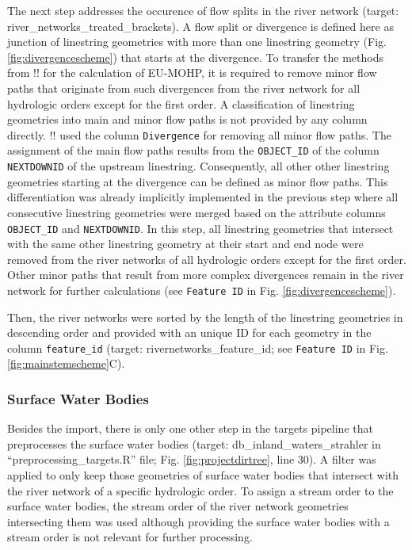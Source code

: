 \documentclass[fleqn,10pt]{wlscirep}
\begin{document}
The next step addresses the occurence of flow splits in the river network (target: river\_networks\_treated\_brackets). A flow split or divergence is defined here as junction of linestring geometries with more than one linestring geometry (Fig. \ref{fig:divergencescheme}) that starts at the divergence. To transfer the methods from !!\cite{belitz_multiorder_2019} for the calculation of EU-MOHP, it is required to remove minor flow paths that originate from such divergences from the river network for all hydrologic orders except for the first order. A classification of linestring geometries into main and minor flow paths is not provided by any column directly. !!\cite{belitz_multiorder_2019} used the column \texttt{Divergence} for removing all minor flow paths. The assignment of the main flow paths results from the \texttt{OBJECT\_ID} of the column \texttt{NEXTDOWNID} of the upstream linestring. Consequently, all other other linestring geometries starting at the divergence can be defined as minor flow paths. This differentiation was already implicitly implemented in the previous step where all consecutive linestring geometries were merged based on the attribute columns \texttt{OBJECT\_ID} and \texttt{NEXTDOWNID}. In this step, all linestring geometries that intersect with the same other linestring geometry at their start and end node were removed from the river networks of all hydrologic orders except for the first order. Other minor paths that result from more complex divergences remain in the river network for further calculations (see \texttt{Feature\ ID} in Fig. \ref{fig:divergencescheme}).

Then, the river networks were sorted by the length of the linestring geometries in descending order and provided with an unique ID for each geometry in the column \texttt{feature\_id} (target: rivernetworks\_feature\_id; see \texttt{Feature\ ID} in Fig. \ref{fig:mainstemscheme}C).

\hypertarget{surface-water-bodies}{%
\subsubsection*{Surface Water Bodies}\label{surface-water-bodies}}

Besides the import, there is only one other step in the targets pipeline that preprocesses the surface water bodies (target: db\_inland\_waters\_strahler in ``preprocessing\_targets.R'' file; Fig. \ref{fig:projectdirtree}, line 30). A filter was applied to only keep those geometries of surface water bodies that intersect with the river network of a specific hydrologic order. To assign a stream order to the surface water bodies, the stream order of the river network geometries intersecting them was used although providing the surface water bodies with a stream order is not relevant for further processing.
\end{document}
